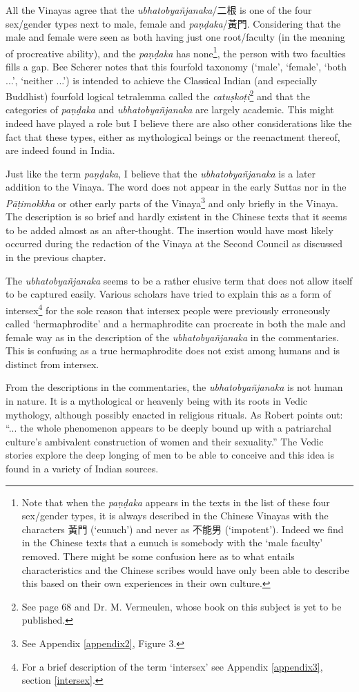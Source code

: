 All the Vinayas agree that the {\em ubhatob­yañ­janaka}/二根 is one of the four sex/gender types next to male, female and {\em paṇḍaka}/黃門. Considering that the male and female were seen as both having just one root/faculty (in the meaning of procreative ability), and the {\em paṇḍaka} has none\footnote{Note that when the {\em paṇḍaka} appears in the texts in the list of these four sex/gender types, it is always described in the Chinese Vinayas with the characters 黃門 (`eunuch') and never as 不能男 (`impotent'). Indeed we find in the Chinese texts that a eunuch is somebody with the `male faculty' removed. There might be some confusion here as to what entails characteristics and the Chinese scribes would have only been able to describe this based on their own experiences in their own culture.}, the person with two faculties fills a gap. Bee Scherer notes that this fourfold taxonomy (`male', `female', `both ...', `neither ...') is intended to achieve the Classical Indian (and especially Buddhist) fourfold logical tetralemma called the {\em catuṣkoṭi}\footnote{See \cite{scherer} page 68 and Dr. M. Vermeulen, whose book on this subject is yet to be published.} and that the categories of {\em paṇḍaka} and {\em ubhatob­yañ­janaka} are largely academic. This might indeed have played a role but I believe there are also other considerations like the fact that these types, either as mythological beings or the reenactment thereof, are indeed found in India.

Just like the term {\em paṇḍaka}, I believe that the {\em ubhatob­yañ­janaka} is a later addition to the Vinaya. The word does not appear in the early Suttas nor in the {\em Pāṭimokkha} or other early parts of the Vinaya\footnote{See Appendix \ref{appendix2}, Figure 3.} and only briefly in the Vinaya. The description is so brief and hardly existent in the Chinese texts that it seems to be added almost as an after-thought. The insertion would have most likely occurred during the redaction of the Vinaya at the Second Council as discussed in the previous chapter.

The {\em ubhatob­yañ­janaka} seems to be a rather elusive term that does not allow itself to be captured easily. Various scholars have tried to explain this as a form of intersex\footnote{For a brief description of the term `intersex' see Appendix \ref{appendix3}, section \ref{intersex}.} for the sole reason that intersex people were previously erroneously called `hermaphrodite' and a hermaphrodite can procreate in both the male and female way as in the description of the {\em ubhatob­yañ­janaka} in the commentaries. This is confusing as a true hermaphrodite does not exist among humans and is distinct from intersex. 

From the descriptions in the commentaries, the {\em ubhatob­yañ­janaka} is not human in nature. It is a mythological or heavenly being with its roots in Vedic mythology, although possibly enacted in religious rituals. As Robert \cite{goldman} points out: ``... the whole phenomenon appears to be deeply bound up with a patriarchal culture's ambivalent construction of women and their sexuality.'' The Vedic stories explore the deep longing of men to be able to conceive and this idea is found in a variety of Indian sources.
